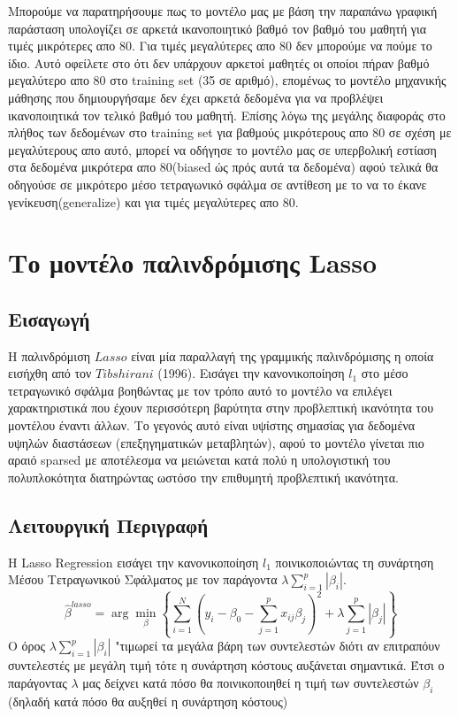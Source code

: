 \documentclass[12pt]{article}
\begin{document}
Μπορούμε να παρατηρήσουμε πως το μοντέλο μας με βάση την παραπάνω γραφική παράσταση υπολογίζει σε αρκετά ικανοποιητικό βαθμό τον βαθμό του μαθητή για τιμές μικρότερες απο 80. Για τιμές μεγαλύτερες απο 80 δεν μπορούμε να πούμε το ίδιο. Αυτό οφείλετε στο ότι δεν υπάρχουν αρκετοί μαθητές οι οποίοι πήραν βαθμό μεγαλύτερο απο 80 στο training set (35 σε αριθμό), επομένως το μοντέλο μηχανικής μάθησης που δημιουργήσαμε δεν έχει αρκετά δεδομένα για να προβλέψει ικανοποιητικά τον τελικό βαθμό του μαθητή. Επίσης λόγω της μεγάλης διαφοράς στο πλήθος των δεδομένων στο training set για βαθμούς μικρότερους απο 80 σε σχέση με μεγαλύτερους απο αυτό, μπορεί να οδήγησε το μοντέλο μας σε υπερβολική εστίαση στα δεδομένα μικρότερα απο 80(biased ώς πρός αυτά τα δεδομένα) αφού τελικά θα οδηγούσε σε μικρότερο μέσο τετραγωνικό σφάλμα σε αντίθεση με το να το έκανε γενίκευση(generalize) και για τιμές μεγαλύτερες απο 80.

\newpage
\section{Το μοντέλο παλινδρόμισης Lasso}
\subsection{Εισαγωγή}

Η παλινδρόμιση $Lasso$ είναι μία παραλλαγή της γραμμικής παλινδρόμισης η οποία εισήχθη από τον $Tibshirani$ (1996). Εισάγει την κανονικοποίηση $l_1$ στο μέσο τετραγωνικό σφάλμα βοηθώντας με τον τρόπο αυτό το μοντέλο να επιλέγει χαρακτηριστικά που έχουν περισσότερη βαρύτητα στην προβλεπτική ικανότητα του μοντέλου έναντι άλλων. Το γεγονός αυτό είναι υψίστης σημασίας για δεδομένα υψηλών διαστάσεων (επεξηγηματικών μεταβλητών), αφού το μοντέλο γίνεται πιο αραιό \textlatin{sparsed} με αποτέλεσμα να μειώνεται κατά πολύ η υπολογιστική του πολυπλοκότητα διατηρώντας ωστόσο την επιθυμητή προβλεπτική ικανότητα.

\subsection{Λειτουργική Περιγραφή}
Η \textlatin{Lasso Regression} εισάγει την κανονικοποίηση $l_1$ ποινικοποιώντας τη συνάρτηση Μέσου Τετραγωνικού Σφάλματος με τον παράγοντα  $\lambda \sum_{i=1}^{p} |\beta_i|$.
\begin{equation}
    \hat{\beta}^{lasso} = \arg \min_{\beta} \left\{\sum_{i=1}^{N} \left( y_i - \beta_0 - \sum_{j=1}^{p} x_{ij} \beta_j \right)^2 + \lambda \sum_{j=1}^{p} |\beta_j| \right\}
\end{equation}
Ο όρος $\lambda \sum_{i=1}^{p} |\beta_i|$ "τιμωρεί τα μεγάλα βάρη των συντελεστών διότι αν επιτραπόυν συντελεστές με μεγάλη τιμή τότε η συνάρτηση κόστους αυξάνεται σημαντικά. Έτσι ο παράγοντας $\lambda$ μας δείχνει κατά πόσο θα ποινικοποιηθεί η τιμή των συντελεστών $\beta_i$ (δηλαδή κατά πόσο θα αυξηθεί η συνάρτηση κόστους)
\end{document}
